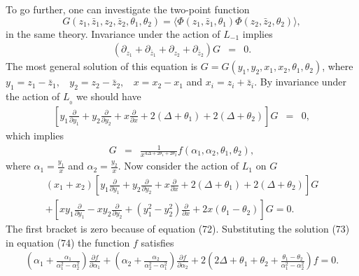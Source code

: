 \documentclass[a4paper,11pt]{article}
\begin{document}
To go further, one can investigate the two-point function
\begin{equation}
G(z_{1},\bar{z}_{1},z_{2},\bar{z}_{2},\theta_{1},\theta_{2})=
\langle\Phi(z_{1},\bar{z}_{1},\theta_{1})\Phi(z_{2},
\bar{z}_{2},\theta_{2})\rangle,
\end{equation}
 in the same theory. Invariance
under the action of $L_{-1}$ implies
\begin{eqnarray}\label{eq:a71}
(\partial_{z_{1}}+\partial_{\bar{z}_{1}}+\partial_{z_{2}}+\partial_{\bar{z}_{2}})G&=&0
.
\end{eqnarray}
The most general solution of this equation is
$G=G(y_{1},y_{2},x_{1},x_{2},\theta_{1},\theta_{2})$, where
$y_{1}=z_{1}-\bar{z}_{1},\:\:\:\:y_{2}=z_{2}-\bar{z}_{2},
\:\:\:\:x=x_{2}-x_{1}$ and $x_{i}=z_{i}+\bar{z}_{i}$. By
invariance under the action of $L_{_{0}}$ we should have
\begin{eqnarray}\label{eq:a72}
\left[y_{1}\frac{\partial}{\partial
y_{1}}+y_{2}\frac{\partial}{\partial
y_{2}}+x\frac{\partial}{\partial
x}+2(\Delta+\theta_{1})+2(\Delta+\theta_{2})\right]G&=&0 ,
\end{eqnarray}
which implies
\begin{eqnarray}\label{eq:a73}
G&=&\frac{1}{x^{4\Delta+2\theta_{1}+2\theta_{2}}}
f(\alpha_{1},\alpha_{2},\theta_{1},\theta_{2}),
\end{eqnarray}
where $\alpha_{1}=\frac{y_{1}}{x}$ and
$\alpha_{2}=\frac{y_{2}}{x}$. Now consider the action of $L_{1}$
on $G$
\begin{eqnarray}\label{eq:a74}
(x_{1}+x_{2})\left[y_{1}\frac{\partial}{\partial
y_{1}}+y_{2}\frac{\partial}{\partial
y_{2}}+x\frac{\partial}{\partial
x}+2(\Delta+\theta_{1})+2(\Delta+\theta_{2})\right]G\nonumber\\
+\left[xy_{1}\frac{\partial}{\partial
y_{1}}-xy_{2}\frac{\partial}{\partial
y_{2}}+(y_{1}^{2}-y_{2}^{2})\frac{\partial}{\partial x}
+2x(\theta_{1}-\theta_{2})\right]G=0 .
\end{eqnarray}
The first bracket is zero because of equation (72). Substituting
the solution (73) in equation (74) the function $f$ satisfies
\begin{eqnarray}\label{eq:a75}
\left(\alpha_{1}+\frac{\alpha_{1}}{\alpha_{1}^{2}-
\alpha_{2}^{2}}\right)\frac{\partial f }{\partial
\alpha_{1}}+\left(\alpha_{2}+\frac{\alpha_{2}}{\alpha_{2}^{2}
-\alpha_{1}^{2}}\right)\frac{\partial f }{\partial
\alpha_{2}}+2\left(2\Delta+\theta_{1}+\theta_{2}+\frac{\theta_{1}
-\theta_{2}}{\alpha_{1}^{2}-\alpha_{2}^{2}}\right)f=0.
\end{eqnarray}
\end{document}

